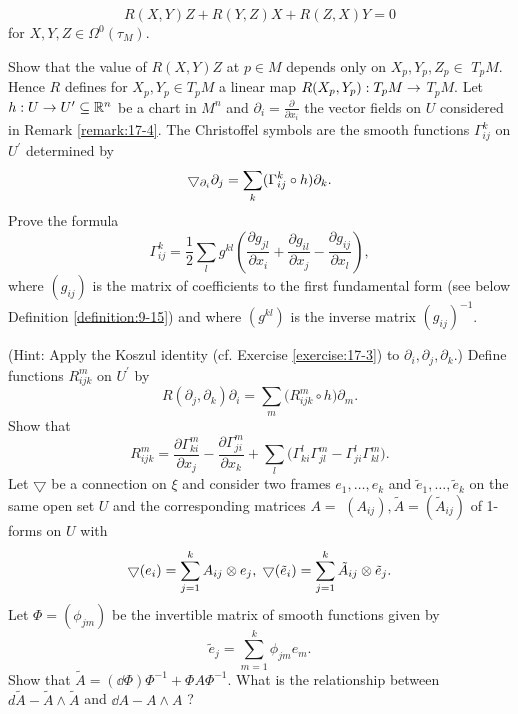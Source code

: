 \begin{enumerate}[label=\theexercise.\arabic*.,ref=\theexercise.\arabic*,leftmargin=2.7em]
    \[
      R( {X,Y}) Z + R( {Y,Z}) X + R( {Z,X}) Y = 0
    \]
    for $X,Y,Z \in  {\Omega }^{0}( {\tau }_{M})$.\par
    Show that the value of $R( {X,Y}) Z$ at $p \in  M$ depends only on ${X}_{p},{Y}_{p},{Z}_{p} \in$  ${T}_{p}M$. Hence $R$ defines for ${X}_{p},{Y}_{p} \in  {T}_{p}M$ a linear map $R( {{X}_{p},{Y}_{p}})  : {T}_{p}M \rightarrow$  ${T}_{p}M$.
  \NewItem Let $h : U \rightarrow  {U}^{\prime } \subseteq  {\ensuremath{\mathbb{R}}}^{n}$ be a chart in ${M}^{n}$ and ${\partial }_{i} = \frac{\partial }{\partial {x}_{i}}$ the vector fields on $U$ considered in Remark \ref{remark:17-4}. The Christoffel symbols are the smooth functions ${\Gamma }_{ij}^{k}$ on ${U}^{\prime }$ determined by
    \[
      \bigtriangledown_{\partial_i}{\partial }_{j} = \sum_{k}( {{\Gamma }_{ij}^{k} \circ  h}) {\partial }_{k}.
    \]
    Prove the formula
    \[
      {\Gamma }_{ij}^{k} = \frac{1}{2}\sum_{l}{g}^{kl}\left( {\frac{\partial {g}_{jl}}{\partial {x}_{i}} + \frac{\partial {g}_{il}}{\partial {x}_{j}}- \frac{\partial {g}_{ij}}{\partial {x}_{l}}}\right),
    \]
    where $( {g}_{ij})$ is the matrix of coefficients to the first fundamental form (see below Definition \ref{definition:9-15}) and where $( {g}^{kl})$ is the inverse matrix ${( {g}_{ij}) }^{-1}$. \par(Hint: Apply the Koszul identity (cf. Exercise \ref{exercise:17-3}) to ${\partial }_{i},{\partial }_{j},{\partial }_{k}$.) Define functions ${R}_{ijk}^{m}$ on ${U}^{\prime }$ by
    \[
      R( {{\partial }_{j},{\partial }_{k}}) {\partial }_{i} = \sum_{m}\big( {{R}_{ijk}^{m} \circ  h}\big) {\partial }_{m}.
    \]
    Show that
    \[
      {R}_{ijk}^{m} = \frac{\partial {\Gamma }_{ki}^{m}}{\partial {x}_{j}}- \frac{\partial {\Gamma }_{ji}^{m}}{\partial {x}_{k}} + \sum_{l}\Big( {{\Gamma }_{ki}^{l}{\Gamma }_{jl}^{m}- {\Gamma }_{ji}^{l}{\Gamma }_{kl}^{m}}\Big).
    \]
  \NewItem Let $\bigtriangledown$ be a connection on $\xi$ and consider two frames ${e}_{1},\ldots,{e}_{k}$ and ${\tilde{e}}_{1},\ldots,{\tilde{e}}_{k}$ on the same open set $U$ and the corresponding matrices $A =$  $( {A}_{ij}),\tilde{A} = ( {\tilde{A}}_{ij})$ of 1-forms on $U$ with
    \[
      \bigtriangledown ( {e}_{i})  = \sum_{{j = 1}}^{k}{A}_{ij} \otimes  {e}_{j},\;\bigtriangledown ( {\tilde{e}}_{i})  = \sum_{{j = 1}}^{k}{\tilde{A}}_{ij} \otimes  {\tilde{e}}_{j}.
    \]
    Let $\Phi  = ( {\phi }_{jm})$ be the invertible matrix of smooth functions given by
    \[
      {\tilde{e}}_{j} = \sum_{{m = 1}}^{k}{\phi }_{jm}{e}_{m}.
    \]
    Show that $\tilde{A} = ( {\dd\Phi }) {\Phi }^{-1} + {\Phi A}{\Phi }^{-1}$. What is the relationship between $d\tilde{A}- \tilde{A} \land  \tilde{A}$ and ${\dd A}- A \land  A$ ?

\end{enumerate}
